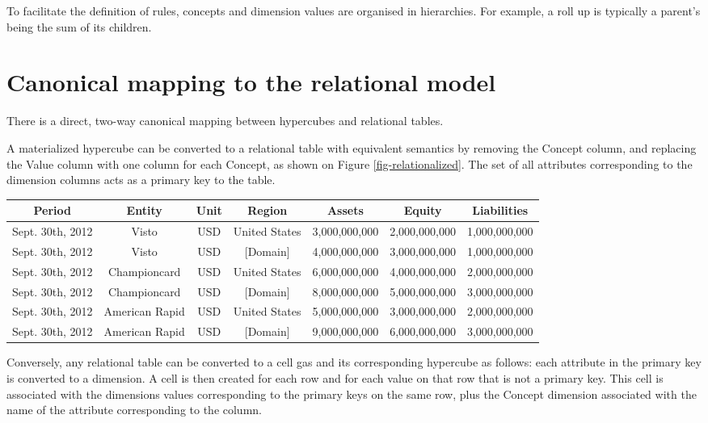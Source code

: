 \documentclass{vldb}
\begin{document}
To facilitate the definition of rules, concepts and dimension values are organised in hierarchies. For example, a roll up is typically a parent's being the sum of its children.

\section{Canonical mapping to the relational model}
\label{section-relational-mapping}
There is a direct, two-way canonical mapping between hypercubes and relational tables.

A materialized hypercube can be converted to a relational table with equivalent semantics by removing the Concept column, and replacing the Value column with one column for each Concept, as shown on Figure \ref{fig-relationalized}. The set of all attributes corresponding to the dimension columns acts as a primary key to the table.

\begin{figure*}
\caption{A relational table corresponding to a hypercube}
\label{fig-relationalized}
\begin{tabular}{|c|c|c|c||c|c|c|}
\hline
Period & Entity & Unit & Region & Assets & Equity & Liabilities \\
\hline
Sept. 30th, 2012 & Visto & USD & United States & 3,000,000,000 & 2,000,000,000 & 1,000,000,000 \\
Sept. 30th, 2012 & Visto & USD & [Domain] & 4,000,000,000 & 3,000,000,000 & 1,000,000,000 \\

Sept. 30th, 2012 & Championcard & USD & United States & 6,000,000,000 & 4,000,000,000 & 2,000,000,000 \\

Sept. 30th, 2012 & Championcard & USD & [Domain] & 8,000,000,000 & 5,000,000,000 & 3,000,000,000 \\

Sept. 30th, 2012 & American Rapid & USD & United States & 5,000,000,000 & 3,000,000,000 & 2,000,000,000 \\

Sept. 30th, 2012 & American Rapid & USD & [Domain] & 9,000,000,000 & 6,000,000,000 & 3,000,000,000 \\

\hline
\end{tabular}
\end{figure*}

Conversely, any relational table can be converted to a cell gas and its corresponding hypercube as follows: each attribute in the primary key is converted to a dimension. A cell is
then created for each row and for each value on that row that is not a primary key. This cell is associated with the dimensions values corresponding to the primary keys on the same row, plus the Concept dimension associated with the name of the attribute corresponding to the column.
\end{document}
